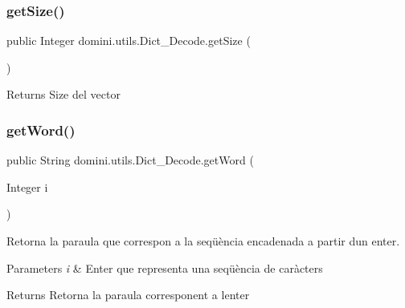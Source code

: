 \subsubsection{\texorpdfstring{get\+Size()}{getSize()}}
{\footnotesize\ttfamily public Integer domini.\+utils.\+Dict\+\_\+\+Decode.\+get\+Size (\begin{DoxyParamCaption}{ }\end{DoxyParamCaption})\hspace{0.3cm}{\ttfamily [inline]}}

\begin{DoxyReturn}{Returns}
Size del vector 
\end{DoxyReturn}
\mbox{\label{classdomini_1_1utils_1_1Dict__Decode_a0f6457460aefe9df50f0cad48f58feee}} 
\subsubsection{\texorpdfstring{get\+Word()}{getWord()}}
{\footnotesize\ttfamily public String domini.\+utils.\+Dict\+\_\+\+Decode.\+get\+Word (\begin{DoxyParamCaption}\item[{Integer}]{i }\end{DoxyParamCaption})\hspace{0.3cm}{\ttfamily [inline]}}



Retorna la paraula que correspon a la seqüència encadenada a partir d\textquotesingle{}un enter. 


\begin{DoxyParams}{Parameters}
{\em i} & Enter que representa una seqüència de caràcters \\
\hline
\end{DoxyParams}
\begin{DoxyReturn}{Returns}
Retorna la paraula corresponent a l\textquotesingle{}enter 
\end{DoxyReturn}
\mbox{\label{classdomini_1_1utils_1_1Dict__Decode_a635432505df1ceaa58a987bb80c6b0a3}} 
